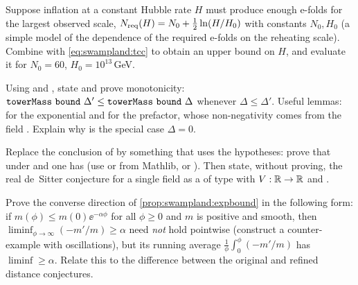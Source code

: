 \begin{exercise}[$\star\star$]
Suppose inflation at a constant Hubble rate $H$ must produce enough e-folds for the largest
observed scale, $N_{\rm req}(H)=N_0+\tfrac12\ln(H/H_0)$ with constants $N_0,H_0$ (a simple model of
the dependence of the required e-folds on the reheating scale). Combine with
\eqref{eq:swampland:tcc} to obtain an upper bound on $H$, and evaluate it for $N_0=60$,
$H_0=10^{13}\,$GeV.
\end{exercise}

\begin{exercise}\label{ex:swampland:leanmono}
Using  and , state and prove monotonicity:
$\lean{towerMass}\ \lean{bound}\ \Delta'\le\lean{towerMass}\ \lean{bound}\ \Delta$ whenever
$\Delta\le\Delta'$. Useful lemmas:  for the exponential and
 for the prefactor, whose non-negativity comes from the field
. Explain why  is the special case $\Delta=0$.
\end{exercise}

\begin{exercise}\label{ex:swampland:leands}
Replace the conclusion  of  by something that uses the
hypotheses: prove that under  and  one has
 (use  or  from Mathlib, or
). Then state, without proving, the real de~Sitter conjecture for a single field
as a  of type  with $V:\mathbb{R}\to\mathbb{R}$ and .
\end{exercise}

\begin{exercise}[$\star\star\star$]
Prove the converse direction of \cref{prop:swampland:expbound} in the following form: if
$m(\phi)\le m(0)\ee^{-\alpha\phi}$ for all $\phi\ge0$ and $m$ is positive and smooth, then
$\liminf_{\phi\to\infty}(-m'/m)\ge\alpha$ need \emph{not} hold pointwise (construct a
counter-example with oscillations), but its running average
$\frac1\phi\int_0^\phi(-m'/m)$ has $\liminf\ge\alpha$. Relate this to the difference between the
original and refined distance conjectures.
\end{exercise}

